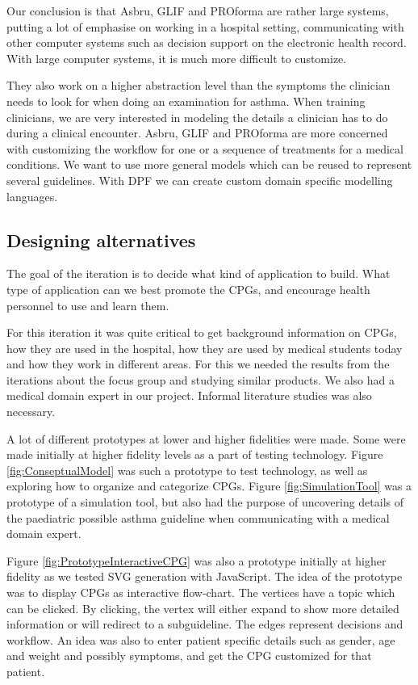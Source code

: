 Our conclusion is that Asbru, GLIF and PROforma are rather large systems, putting a lot of emphasise on working in a hospital setting, communicating with other computer systems such as decision support on the electronic health record. With large computer systems, it is much more difficult to customize.

They also work on a higher abstraction level than the symptoms the clinician needs to look for when doing an examination for asthma. When training clinicians, we are very interested in modeling the details a clinician has to do during a clinical encounter. Asbru, GLIF and PROforma are more concerned with customizing the workflow for one or a sequence of treatments for a medical conditions. We want to use more general models which can be reused to represent several guidelines. With DPF we can create custom domain specific modelling languages.


\subsection{Designing alternatives}
The goal of the iteration is to decide what kind of application to build. What type of application can we best promote the CPGs, and encourage health personnel to use and learn them.

For this iteration it was quite critical to get background information on CPGs, how they are used in the hospital, how they are used by medical students today and how they work in different areas. For this we needed the results from the iterations about the focus group and studying similar products. We also had a medical domain expert in our project. Informal literature studies was also necessary.

A lot of different prototypes at lower and higher fidelities were made. Some were made initially at higher fidelity levels as a part of testing technology. Figure \ref{fig:ConseptualModel} was such a prototype to  test technology, as well as exploring how to organize and categorize CPGs. Figure \ref{fig:SimulationTool} was a prototype of a simulation tool, but also had the purpose of uncovering details of the paediatric possible asthma guideline \parencite{RepublicofKeny2016} when communicating with a medical domain expert. 

Figure \ref{fig:PrototypeInteractiveCPG} was also a prototype initially at higher fidelity as we tested SVG generation with JavaScript. The idea of the prototype was to display CPGs as interactive flow-chart. The vertices have a topic which can be clicked. By clicking, the vertex will either expand to show more detailed information or will redirect to a subguideline. The edges represent decisions and workflow. An idea was also to enter patient specific details such as gender, age and weight and possibly symptoms, and get the CPG customized for that patient.


